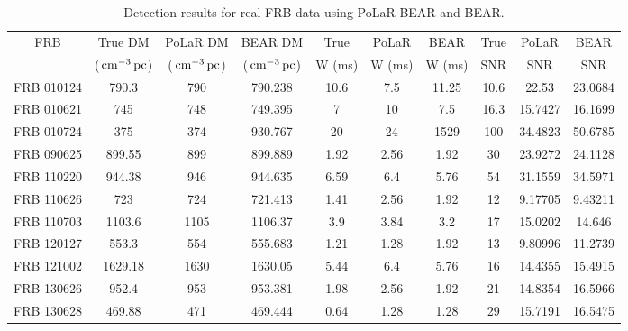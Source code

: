 \begin{table}
    \centering
    \caption[Detection results for real FRB data]{Detection results for real FRB data using PoLaR BEAR and BEAR.}
    \tiny
    \def\arraystretch{1.25}
    \begin{tabular}{cccccccccc}
        \hline
             FRB     &  True DM  &  PoLaR DM  &  BEAR DM  &  True  &  PoLaR  &  BEAR  &  True  &  PoLaR  &  BEAR  \\
             & ($\,\text{cm}^{-3}\,\text{pc}$) & ($\,\text{cm}^{-3}\,\text{pc}$) & ($\,\text{cm}^{-3}\,\text{pc}$) & W (ms) & W (ms) & W (ms) & SNR & SNR & SNR \\
        \hline
         FRB 010124  &   790.3   &       790       &  790.238  &   10.6   &      7.5       &  11.25   &    10.6    &      22.53       &  23.0684   \\
         FRB 010621  &    745    &       748       &  749.395  &    7     &       10       &   7.5    &    16.3    &     15.7427      &  16.1699   \\
         FRB 010724  &    375    &       374       &  930.767  &    20    &       24       &   1529   &    100     &     34.4823      &  50.6785   \\
         FRB 090625  &  899.55   &       899       &  899.889  &   1.92   &      2.56      &   1.92   &     30     &     23.9272      &  24.1128   \\
         FRB 110220  &  944.38   &       946       &  944.635  &   6.59   &      6.4       &   5.76   &     54     &     31.1559      &  34.5971   \\
         FRB 110626  &    723    &       724       &  721.413  &   1.41   &      2.56      &   1.92   &     12     &     9.17705      &  9.43211   \\
         FRB 110703  &  1103.6   &      1105       &  1106.37  &   3.9    &      3.84      &   3.2    &     17     &     15.0202      &   14.646   \\
         FRB 120127  &   553.3   &       554       &  555.683  &   1.21   &      1.28      &   1.92   &     13     &     9.80996      &  11.2739   \\
         FRB 121002  &  1629.18  &      1630       &  1630.05  &   5.44   &      6.4       &   5.76   &     16     &     14.4355      &  15.4915   \\
         FRB 130626  &   952.4   &       953       &  953.381  &   1.98   &      2.56      &   1.92   &     21     &     14.8354      &  16.5966   \\
         FRB 130628  &  469.88   &       471       &  469.444  &   0.64   &      1.28      &   1.28   &     29     &     15.7191      &  16.5475   \\

\end{tabular}
\end{table}
